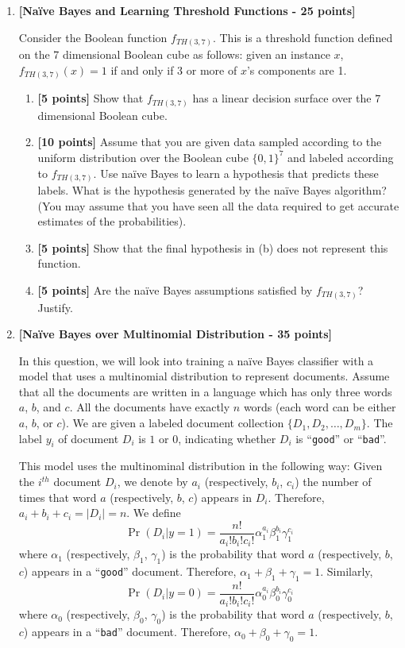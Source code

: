 \begin{enumerate}
\item {\bf [Na\"ive Bayes and Learning Threshold Functions - 25 points]}

Consider the Boolean function $f_{TH(3,7)}$.  This is a threshold function
defined on the 7 dimensional Boolean cube as follows: given an instance $x$,
$f_{TH(3,7)}(x) = 1$ if and only if 3 or more of $x$'s components are 1.
\begin{enumerate}
\item {\bf [5 points]} Show that $f_{TH(3,7)}$ has a linear decision surface over the 
$7$ dimensional Boolean cube.
\item {\bf [10 points]}
Assume that you are given data sampled according to the uniform distribution
over the Boolean cube $\{0, 1\}^7$ and labeled according to $f_{TH(3,7)}$.
Use na\"ive Bayes to learn a hypothesis that predicts these labels.  What is
the hypothesis generated by the na\"ive Bayes algorithm?  (You may assume that
you have seen all the data required to get accurate estimates of the
probabilities).
\item {\bf [5 points]}
Show that the final hypothesis in (b) does not represent this function.
\item {\bf [5 points]}
Are the na\"ive Bayes assumptions satisfied by $f_{TH(3,7)}$?  Justify.
\end{enumerate}

\item {\bf [Na\"ive Bayes over Multinomial Distribution - 35 points]}

In this question, we will look into training a na\"ive Bayes classifier with a model that uses 
a multinomial distribution to represent documents. Assume that all the documents are 
written in a language which has only three words $a$, $b$, and $c$. All the 
documents have exactly $n$ words (each word can be either $a$, $b$, or $c$). We 
are given a labeled document collection $\{D_1, D_2, \ldots, D_m\}$. The label $y_i$ 
of document $D_i$ is $1$ or $0$, indicating whether $D_i$ is ``\texttt{good}'' or 
``\texttt{bad}''.

This model uses the multinominal distribution in the following way: Given the 
$i^{th}$ document $D_i$, we denote by $a_i$ (respectively, $b_i$, $c_i$) the 
number of times that word $a$ (respectively, $b$, $c$) appears in $D_i$. Therefore, 
$a_i + b_i + c_i = |D_i| = n$. We define
\[ \Pr(D_i | y = 1) = \frac{n!}{a_i! b_i! c_i!} \alpha_1^{a_i} \beta_1^{b_i} \gamma_1^{c_i} \]
where $\alpha_1$ (respectively, $\beta_1$, $\gamma_1$) is the probability that word 
$a$ (respectively, $b$, $c$) appears in a ``\texttt{good}'' document. Therefore,
$\alpha_1 + \beta_1 + \gamma_1 = 1$. Similarly,
\[ \Pr(D_i | y = 0) = \frac{n!}{a_i! b_i! c_i!} \alpha_0^{a_i} \beta_0^{b_i} \gamma_0^{c_i} \]
where $\alpha_0$ (respectively, $\beta_0$, $\gamma_0$) is the probability that word 
$a$ (respectively, $b$, $c$) appears in a ``\texttt{bad}'' document. Therefore, 
$\alpha_0 + \beta_0 + \gamma_0 = 1$.


\end{enumerate}
